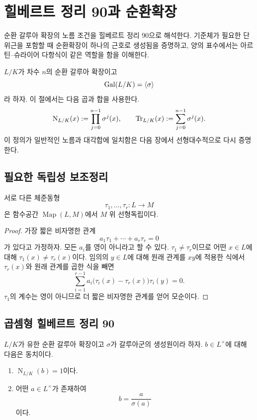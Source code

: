 \clearpage
\section{힐베르트 정리 90과 순환확장}
\label{sec:hilbert90-cyclic-extensions}

\begin{learninggoal}
순환 갈루아 확장의 노름 조건을 힐베르트 정리 90으로 해석한다. 기준체가 필요한 단위근을 포함할 때 순환확장이 하나의 근호로 생성됨을 증명하고, 양의 표수에서는 아르틴--슈라이어 다항식이 같은 역할을 함을 이해한다.
\end{learninggoal}

$L/K$가 차수 $n$의 순환 갈루아 확장이고
\[
  \operatorname{Gal}(L/K)=\langle\sigma\rangle
\]
라 하자. 이 절에서는 다음 곱과 합을 사용한다.
\[
  \operatorname N_{L/K}(x)
  :=\prod_{j=0}^{n-1}\sigma^j(x),
  \qquad
  \operatorname{Tr}_{L/K}(x)
  :=\sum_{j=0}^{n-1}\sigma^j(x).
\]
이 정의가 일반적인 노름과 대각합에 일치함은 다음 장에서 선형대수적으로 다시 증명한다.

\subsection{필요한 독립성 보조정리}

\begin{lemma}
\label{lem:embeddings-linearly-independent}
서로 다른 체준동형
\[
  \tau_1,\dots,\tau_r:L\longrightarrow M
\]
은 함수공간 $\operatorname{Map}(L,M)$에서 $M$ 위 선형독립이다.
\end{lemma}

\begin{proof}
가장 짧은 비자명한 관계
\[
  a_1\tau_1+\cdots+a_r\tau_r=0
\]
가 있다고 가정하자. 모든 $a_i$를 영이 아니라고 할 수 있다. $\tau_1\ne\tau_r$이므로 어떤 $x\in L$에 대해 $\tau_1(x)\ne\tau_r(x)$이다. 임의의 $y\in L$에 대해 원래 관계를 $xy$에 적용한 식에서 $\tau_r(x)$와 원래 관계를 곱한 식을 빼면
\[
  \sum_{i=1}^{r-1}
  a_i\bigl(\tau_i(x)-\tau_r(x)\bigr)\tau_i(y)=0.
\]
$\tau_1$의 계수는 영이 아니므로 더 짧은 비자명한 관계를 얻어 모순이다.
\end{proof}

\subsection{곱셈형 힐베르트 정리 90}

\begin{theorem}[힐베르트 정리 90]
\label{thm:hilbert90-multiplicative}
$L/K$가 유한 순환 갈루아 확장이고 $\sigma$가 갈루아군의 생성원이라 하자. $b\in L^\times$에 대해 다음은 동치이다.
\begin{enumerate}[label=(\roman*)]
  \item $\operatorname N_{L/K}(b)=1$이다.
  \item 어떤 $a\in L^\times$가 존재하여
  \[
    b=\frac{a}{\sigma(a)}
  \]
  이다.
\end{enumerate}
\end{theorem}

